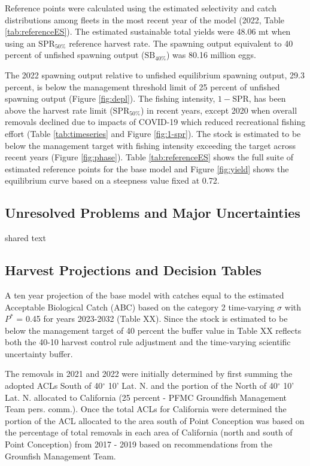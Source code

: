 \documentclass[11pt,
  english,
  letterpaper,
]{article}
\begin{document}
Reference points were calculated using the estimated selectivity and catch distributions among fleets in the most recent year of the model (2022, Table \ref{tab:referenceES}). The estimated sustainable total yields were 48.06 mt when using an \(\text{SPR}_{50\%}\) reference harvest rate. The spawning output equivalent to 40 percent of unfished spawning output (\(\text{SB}_{40\%}\)) was 80.16 million eggs.

The 2022 spawning output relative to unfished equilibrium spawning output, 29.3 percent, is below the management threshold limit of 25 percent of unfished spawning output (Figure \ref{fig:depl}). The fishing intensity, \(1-\text{SPR}\), has been above the harvest rate limit (\(\text{SPR}_{50\%}\)) in recent years, except 2020 when overall removals declined due to impacts of COVID-19 which reduced recreational fishing effort (Table \ref{tab:timeseries} and Figure \ref{fig:1-spr}). The stock is estimated to be below the management target with fishing intensity exceeding the target across recent years (Figure \ref{fig:phase}). Table \ref{tab:referenceES} shows the full suite of estimated reference points for the base model and Figure \ref{fig:yield} shows the equilibrium curve based on a steepness value fixed at 0.72.

\hypertarget{unresolved-problems-and-major-uncertainties-2}{%
\subsection{Unresolved Problems and Major Uncertainties}\label{unresolved-problems-and-major-uncertainties-2}}

shared text

\hypertarget{harvest-projections-and-decision-tables}{%
\subsection{Harvest Projections and Decision Tables}\label{harvest-projections-and-decision-tables}}

A ten year projection of the base model with catches equal to the estimated Acceptable Biological Catch (ABC) based on the category 2 time-varying \(\sigma\) with \(P^*\) = 0.45 for years 2023-2032 (Table XX). Since the stock is estimated to be below the management target of 40 percent the buffer value in Table XX reflects both the 40-10 harvest control rule adjustment and the time-varying scientific uncertainty buffer.

The removals in 2021 and 2022 were initially determined by first summing the adopted ACLs South of 40\(^\circ\) 10' Lat. N. and the portion of the North of 40\(^\circ\) 10' Lat. N. allocated to California (25 percent - PFMC Groundfish Management Team pers. comm.). Once the total ACLs for California were determined the portion of the ACL allocated to the area south of Point Conception was based on the percentage of total removals in each area of California (north and south of Point Conception) from 2017 - 2019 based on recommendations from the Grounfish Management Team.
\end{document}

